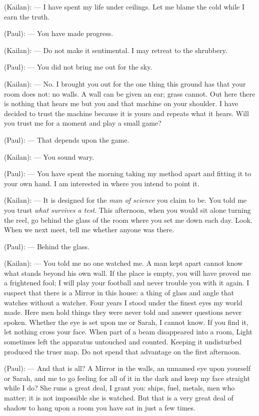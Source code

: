 \begin{room}
(Kailan): --- I have spent my life under ceilings. Let me blame the cold while I earn the truth.

(Paul): --- You have made progress.

(Kailan): --- Do not make it sentimental. I may retreat to the shrubbery.

(Paul): --- You did not bring me out for the sky.

(Kailan): --- No. I brought you out for the one thing this ground has that your room does not: no walls. A wall can be given an ear; grass cannot. Out here there is nothing that hears me but you and that machine on your shoulder. I have decided to trust the machine because it is yours and repeats what it hears. Will you trust me for a moment and play a small game?

(Paul): --- That depends upon the game.

(Kailan): --- You sound wary.

(Paul): --- You have spent the morning taking my method apart and fitting it to your own hand. I am interested in where you intend to point it.

(Kailan): --- It is designed for the \textit{man of science} you claim to be. You told me you trust \textit{what survives a test}. This afternoon, when you would sit alone turning the reel, go behind the glass of the room where you set me down each day. Look. When we next meet, tell me whether anyone was there.

(Paul): --- Behind the glass.

(Kailan): --- You told me no one watched me. A man kept apart cannot know what stands beyond his own wall. If the place is empty, you will have proved me a frightened fool; I will play your football and never trouble you with it again. I suspect that there is a Mirror in this house: a thing of glass and angle that watches without a watcher. Four years I stood under the finest eyes my world made. Here men hold things they were never told and answer questions never spoken. Whether the eye is set upon me or Sarah, I cannot know. If you find it, let nothing cross your face. When part of a beam disappeared into a room, Light sometimes left the apparatus untouched and counted. Keeping it undisturbed produced the truer map. Do not spend that advantage on the first afternoon.

(Paul): --- And that is all? A Mirror in the walls, an unnamed eye upon yourself or Sarah, and me to go feeling for all of it in the dark and keep my face straight while I do? She runs a great deal, I grant you: ships, fuel, metals, men who matter; it is not impossible she is watched. But that is a very great deal of shadow to hang upon a room you have sat in just a few times.


\end{room}
